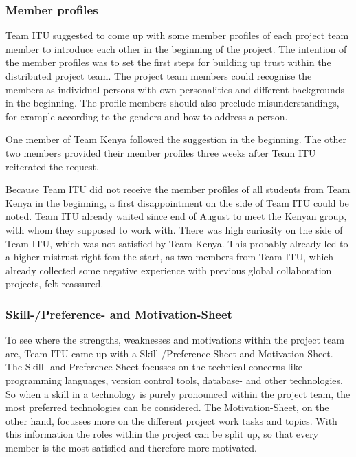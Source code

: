\subsubsection {Member profiles}
\label{sec:member_profiles}
Team ITU suggested to come up with some member profiles of each project team member to introduce each other in the beginning of the project. The intention of the member profiles was to set the first steps for building up trust within the distributed project team. The project team members could recognise the members as individual persons with own personalities and different backgrounds in the beginning. The profile members should also preclude misunderstandings, for example according to the genders and how to address a person.

One member of Team Kenya followed the suggestion in the beginning. The other two members provided their member profiles three weeks after Team ITU reiterated the request.

Because Team ITU did not receive the member profiles of all students from Team Kenya in the beginning, a first disappointment on the side of Team ITU could be noted. Team ITU already waited since end of August to meet the Kenyan group, with whom they supposed to work with. There was high curiosity on the side of Team ITU, which was not satisfied by Team Kenya. This probably already led to a higher mistrust right fom the start, as two members from Team ITU, which already collected some negative experience with previous global collaboration projects, felt reassured.


\subsubsection {Skill-/Preference- and Motivation-Sheet}
\label{sec:skill_sheet}
To see where the strengths, weaknesses and motivations within the project team are, Team ITU came up with a Skill-/Preference-Sheet and Motivation-Sheet. The Skill- and Preference-Sheet focusses on the technical concerns like programming languages, version control tools, database- and other technologies. So when a skill in a technology is purely pronounced within the project team, the most preferred technologies can be considered. The Motivation-Sheet, on the other hand, focusses more on the different project work tasks and topics. With this information the roles within the project can be split up, so that every member is the most satisfied and therefore more motivated.

